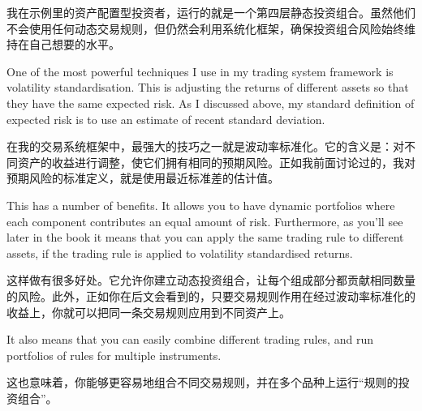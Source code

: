 \begin{chineseblock}我在示例里的资产配置型投资者，运行的就是一个第四层静态投资组合。虽然他们不会使用任何动态交易规则，但仍然会利用系统化框架，确保投资组合风险始终维持在自己想要的水平。\end{chineseblock}


\begin{englishblock} One of the most powerful techniques I use in my trading system framework is volatility standardisation. This is adjusting the returns of different assets so that they have the same expected risk. As I discussed above, my standard definition of expected risk is to use an estimate of recent standard deviation. \end{englishblock}

\begin{chineseblock}在我的交易系统框架中，最强大的技巧之一就是波动率标准化。它的含义是：对不同资产的收益进行调整，使它们拥有相同的预期风险。正如我前面讨论过的，我对预期风险的标准定义，就是使用最近标准差的估计值。\end{chineseblock}

\bipairgap

\begin{englishblock} This has a number of benefits. It allows you to have dynamic portfolios where each component contributes an equal amount of risk. Furthermore, as you'll see later in the book it means that you can apply the same trading rule to different assets, if the trading rule is applied to volatility standardised returns. \end{englishblock}

\begin{chineseblock}这样做有很多好处。它允许你建立动态投资组合，让每个组成部分都贡献相同数量的风险。此外，正如你在后文会看到的，只要交易规则作用在经过波动率标准化的收益上，你就可以把同一条交易规则应用到不同资产上。\end{chineseblock}

\bipairgap

\begin{englishblock} It also means that you can easily combine different trading rules, and run portfolios of rules for multiple instruments. \end{englishblock}

\begin{chineseblock}这也意味着，你能够更容易地组合不同交易规则，并在多个品种上运行“规则的投资组合”。\end{chineseblock}

